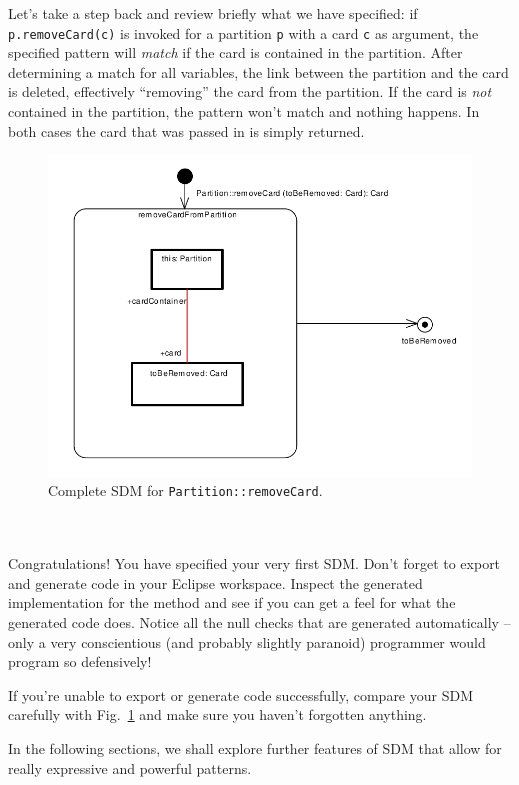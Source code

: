Let's take a step back and review briefly what we have specified:  if
\texttt{p.remove\-Card(c)} is invoked for a partition \texttt{p} with a card
\texttt{c} as argument, the specified pattern will \emph{match} if the card is
contained in the partition.  After determining a match for all variables, the
link between the partition and the card is deleted, effectively ``removing'' the
card from the partition.  If the card is \emph{not} contained in the partition,
the pattern won't match and nothing happens. In both cases the card that was
passed in is simply returned.

\begin{figure}[htbp]
\begin{center}
  \includegraphics[width=\textwidth]{pics/sdmBilder/removeCard/sdm15}
  \caption{Complete SDM for \texttt{Partition::removeCard}.}  
  \label{fig:sdm_complete_control_flow}
\end{center}
\end{figure}

~\\~\\

Congratulations!  You have specified your very first SDM.  Don't forget to
export and generate code in your Eclipse workspace. 
Inspect the generated implementation for the method and see if you can get a feel for what the generated code does. 
Notice all the null checks that are generated automatically -- only a very conscientious (and probably slightly paranoid) programmer would program so defensively!

If you're unable to export or generate code successfully, compare your SDM
carefully with Fig.~\ref{fig:sdm_complete_control_flow} and make sure you
haven't forgotten anything.

In the following sections, we shall explore further features of SDM that
allow for really expressive and powerful patterns.
